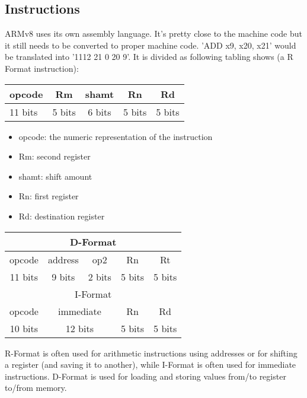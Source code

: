 \documentclass[a4paper]{scrartcl}
\begin{document}
        \subsection{Instructions}
            ARMv8 uses its own assembly language. It's pretty close to the machine code but it still needs to be converted to proper machine code. 'ADD x9, x20, x21'
            would be translated into '1112 21 0 20 9'. It is divided as following tabling shows (a R Format instruction): 
            \begin{center}
            \begin{tabular}{|p{5cm}|c|c|c|c|}
                \hline
                opcode & Rm & shamt & Rn & Rd \\
                \hline
                11 bits & 5 bits & 6 bits & 5 bits & 5 bits \\ 
                \hline
            \end{tabular}
            \end{center}
            
            \begin{itemize}
                \item opcode: the numeric representation of the instruction
                \item Rm: second register
                \item shamt: shift amount
                \item Rn: first register
                \item Rd: destination register
            \end{itemize}
        

            \begin{center}
                \begin{tabular}{|c|c|c|c|c|}
                    \hline
                    \multicolumn{5}{|c|}{D-Format} \\
                    \hline
                    opcode & address & op2 & Rn & Rt \\
                    \hline
                    11 bits & 9 bits & 2 bits & 5 bits & 5 bits \\
                    \hline \hline
                    \multicolumn{5}{|c|}{I-Format} \\
                    \hline
                    opcode & \multicolumn{2}{|c|}{immediate}  & Rn & Rd \\
                    \hline
                    10 bits & \multicolumn{2}{|c|}{12 bits} & 5 bits & 5 bits \\
                    \hline
                \end{tabular}
            \end{center}
            R-Format is often used for arithmetic instructions using addresses or for shifting a register (and saving it to another),
            while I-Format is often used for immediate instructions. D-Format is used for loading and storing values from/to register to/from memory.
\end{document}
